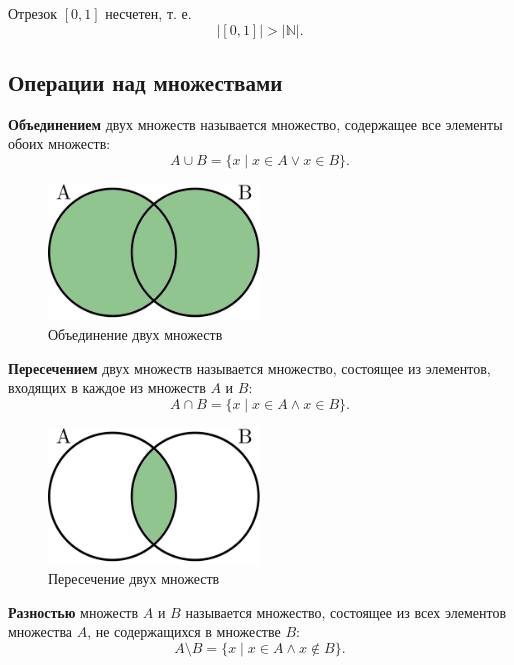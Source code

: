 \begin{theorem*}
    Отрезок \([0, 1]\) несчетен, т. е.
    \[
        |[0, 1]| > |\mathbb{N}|.
    \]
\end{theorem*}

\subsection{Операции над множествами}

\textbf{Объединением} двух множеств называется множество, содержащее все элементы обоих множеств:
\[
    A \cup B = \{x \mid x \in A \lor x \in B\}.
\]

\begin{figure}[H]
    \centering
    \includegraphics[width=0.5\textwidth]{images/set-combining.png}
    \caption{Объединение двух множеств}
\end{figure}

\textbf{Пересечением} двух множеств называется множество, состоящее из элементов, входящих в каждое из множеств \(A\) и \(B\):
\[
    A \cap B = \{x \mid x \in A \land x \in B\}.
\]

\begin{figure}[H]
    \centering
    \includegraphics[width=0.5\textwidth]{images/set-intersection.png}
    \caption{Пересечение двух множеств}
\end{figure}

\textbf{Разностью} множеств \(A\) и \(B\) называется множество, состоящее из всех элементов множества \(A\), не содержащихся в множестве \(B\):
\[
    A \setminus B = \{x \mid x \in A \land x \notin B\}.
\]

